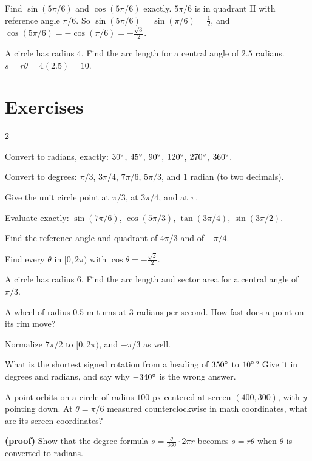 \begin{example}
Find $\sin(5\pi/6)$ and $\cos(5\pi/6)$ exactly.
\solution $5\pi/6$ is in quadrant II with reference angle $\pi/6$. So $\sin(5\pi/6) = \sin(\pi/6) = \tfrac{1}{2}$, and $\cos(5\pi/6) = -\cos(\pi/6) = -\tfrac{\sqrt{3}}{2}$.
\end{example}

\begin{example}
A circle has radius $4$. Find the arc length for a central angle of $2.5$ radians.
\solution $s = r\theta = 4(2.5) = 10$.
\end{example}

\section{Exercises}

\begin{multicols}{2}
\begin{exercises}
\item Convert to radians, exactly: $30^\circ$, $45^\circ$, $90^\circ$, $120^\circ$, $270^\circ$, $360^\circ$.
\item Convert to degrees: $\pi/3$, $3\pi/4$, $7\pi/6$, $5\pi/3$, and $1$ radian (to two decimals).
\item Give the unit circle point at $\pi/3$, at $3\pi/4$, and at $\pi$.
\item Evaluate exactly: $\sin(7\pi/6)$, $\cos(5\pi/3)$, $\tan(3\pi/4)$, $\sin(3\pi/2)$.
\item Find the reference angle and quadrant of $4\pi/3$ and of $-\pi/4$.
\item Find every $\theta$ in $[0, 2\pi)$ with $\cos\theta = -\tfrac{\sqrt{2}}{2}$.
\item A circle has radius $6$. Find the arc length and sector area for a central angle of $\pi/3$.
\item A wheel of radius $0.5$ m turns at $3$ radians per second. How fast does a point on its rim move?
\item Normalize $7\pi/2$ to $[0, 2\pi)$, and $-\pi/3$ as well.
\item What is the shortest signed rotation from a heading of $350^\circ$ to $10^\circ$? Give it in degrees and radians, and say why $-340^\circ$ is the wrong answer.
\item A point orbits on a circle of radius $100$ px centered at screen $(400, 300)$, with $y$ pointing down. At $\theta = \pi/6$ measured counterclockwise in math coordinates, what are its screen coordinates?
\item \textbf{(proof)} Show that the degree formula $s = \frac{\theta}{360} \cdot 2\pi r$ becomes $s = r\theta$ when $\theta$ is converted to radians.
\end{exercises}
\end{multicols}

